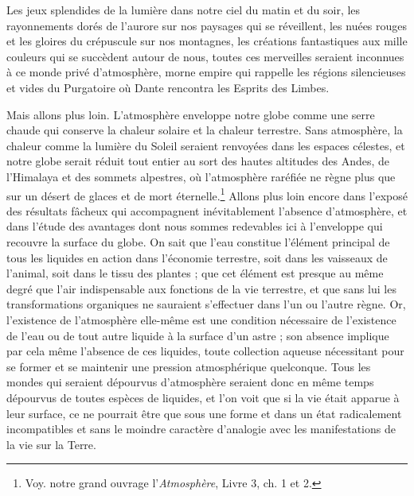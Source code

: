 \documentclass[a4paper, 11pt, oneside, landscape]{article}
\begin{document}
Les jeux splendides de la lumière dans notre ciel du matin et du soir, les rayonnements dorés de l'aurore sur nos paysages qui se réveillent, les nuées rouges et les gloires du crépuscule sur nos montagnes, les créations fantastiques aux mille couleurs qui se succèdent autour de nous, toutes ces merveilles seraient inconnues à ce monde privé d'atmosphère, morne empire qui rappelle les régions silencieuses et vides du Purgatoire où Dante rencontra les Esprits des Limbes.

Mais allons plus loin. L'atmosphère enveloppe notre globe comme une serre chaude qui conserve la chaleur solaire et la chaleur terrestre. Sans atmosphère, la chaleur comme la lumière du Soleil seraient renvoyées dans les espaces célestes, et notre globe serait réduit tout entier au sort des hautes altitudes des Andes, de l'Himalaya et des sommets alpestres, où l'atmosphère raréfiée ne règne plus que sur un désert de glaces et de mort éternelle.\footnote{Voy. notre grand ouvrage l'\emph{Atmosphère}, Livre 3, ch. 1 et 2.} Allons plus loin encore dans l'exposé des résultats fâcheux qui accompagnent inévitablement l'absence d'atmosphère, et dans l'étude des avantages dont nous sommes redevables ici à l'enveloppe qui recouvre la surface du globe. On sait que l'eau constitue l'élément principal de tous les liquides en action dans l'économie terrestre, soit dans les vaisseaux de l'animal, soit dans le tissu des plantes ; que cet élément est presque au même degré que l'air indispensable aux fonctions de la vie terrestre, et que sans lui les transformations organiques ne sauraient s'effectuer dans l'un ou l'autre règne. Or, l'existence de l'atmosphère elle-même est une condition nécessaire de l'existence de l'eau ou de tout autre liquide à la surface d'un astre ; son absence implique par cela même l'absence de ces liquides, toute collection aqueuse nécessitant pour se former et se maintenir une pression atmosphérique quelconque. Tous les mondes qui seraient dépourvus d'atmosphère seraient donc en même temps dépourvus de toutes espèces de liquides, et l'on voit que si la vie était apparue à leur surface, ce ne pourrait être que sous une forme et dans un état radicalement incompatibles et sans le moindre caractère d'analogie avec les manifestations de la vie sur la Terre.
\end{document}
